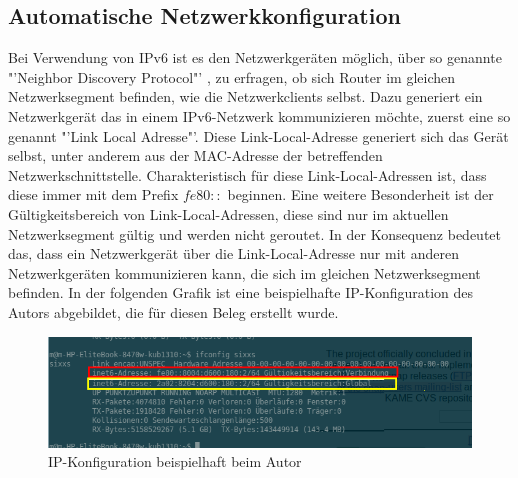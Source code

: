 \documentclass[a4paper,12pt]{scrartcl}
\begin{document}
\subsection{Automatische Netzwerkkonfiguration}
Bei Verwendung von IPv6 ist es den Netzwerkger\"aten m\"oglich, \"uber so genannte "'Neighbor Discovery Protocol"'  \cite[RFC3122]{RFC3122},  \cite[RFC4861]{RFC4861} zu erfragen, ob sich Router im gleichen Netzwerksegment befinden, wie die Netzwerkclients selbst. Dazu generiert ein Netzwerkger\"at das in einem IPv6-Netzwerk kommunizieren m\"ochte, zuerst eine so genannt "'Link Local Adresse"'. Diese Link-Local-Adresse generiert sich das Ger\"at selbst, unter anderem aus der MAC-Adresse der betreffenden Netzwerkschnittstelle. Charakteristisch f\"ur diese Link-Local-Adressen ist, dass diese immer mit dem Prefix $fe80::$ beginnen. Eine weitere Besonderheit ist der G\"ultigkeitsbereich von Link-Local-Adressen, diese sind nur im aktuellen Netzwerksegment g\"ultig und werden nicht geroutet. In der Konsequenz bedeutet das, dass ein Netzwerkger\"at \"uber die Link-Local-Adresse nur mit anderen Netzwerkger\"aten kommunizieren kann, die sich im gleichen Netzwerksegment befinden. In der folgenden Grafik ist eine beispielhafte IP-Konfiguration des Autors abgebildet, die f\"ur diesen Beleg erstellt wurde.

\begin{figure}[htb]
\begin{center}
 \includegraphics[width=1\hsize]{./images/ifconfig.png}
 \end{center}
\caption[IP-Konfiguration beispielhaft beim Autor, Quelle: Autor,]{\label{ifconfig}IP-Konfiguration beispielhaft beim Autor}
\end{figure}
\end{document}
